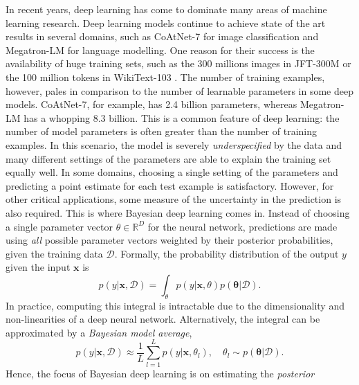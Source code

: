 \documentclass[msc,deptreport.inf]{infthesis} %
\newcommand{\matr}[1]{\mathbf{#1}}
\newcommand{\bgreek}[1]{\boldsymbol{#1}}
\newcommand{\R}{\mathbb R}
\begin{document}
In recent years, deep learning \cite{goodfellow2016} has come to dominate many areas of machine learning research. Deep learning models 
continue to achieve state of the art results in several domains, such as CoAtNet-7 \cite{dai2021} for image classification and Megatron-LM \cite{shoeybi2019} for language modelling. One reason for their success is the availability of huge training sets, such as the 300 millions images in JFT-300M \cite{sun2017} or the 100 million tokens in WikiText-103 \cite{merity2016}. The number of training examples, however, pales in comparison to the number of learnable parameters in some deep models. CoAtNet-7, for example, has 2.4 billion parameters, whereas Megatron-LM has a whopping 8.3 billion. This is a common feature of deep learning: the number of model parameters is often greater than the number of training examples. In this scenario, the model is severely \emph{underspecified} by the data and many different settings of the parameters are able to explain the training set equally well. In some domains, choosing a single setting of the parameters and predicting a point estimate for each test example is satisfactory. However, for other critical applications, some measure of the uncertainty in the prediction is also required. 
This is where Bayesian deep learning comes in. Instead of choosing a single parameter vector $\theta \in \R^D$ for the neural network, predictions are made using \emph{all} possible parameter vectors weighted by their posterior probabilities, given the training data $\mathcal{D}$. Formally, the probability distribution of the output $y$ given the input $\matr{x}$ is
\begin{equation}
	p(y | \matr{x}, \mathcal{D}) = \int_{\theta} p(y | \matr{x}, \theta) p(\bgreek{\theta} | \mathcal{D}).
\end{equation}
In practice, computing this integral is intractable due to the dimensionality and non-linearities of a deep neural network. Alternatively, the integral can be approximated by a \emph{Bayesian model average},
\begin{equation}
	p(y | \matr{x}, \mathcal{D}) \approx \frac{1}{L} \sum_{l=1}^L p(y | \matr{x}, \theta_l), 
	\quad \theta_l \sim p(\bgreek{\theta} | \mathcal{D}).
\end{equation}
Hence, the focus of Bayesian deep learning is on estimating the \emph{posterior}
\end{document}
